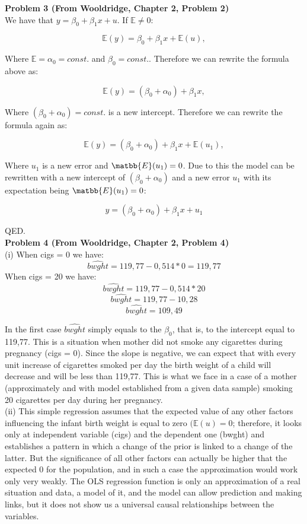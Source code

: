 \documentclass{article}
\begin{document}
\textbf{Problem 3 (From Wooldridge, Chapter 2, Problem 2)}
\\

We have that $y = \beta_0 + \beta_1x + u$. If $\mathbb{E} \neq 0$: 

$$\mathbb{E}(y) = \beta_0 + \beta_1x + \mathbb{E}(u),$$

Where $\mathbb{E} = \alpha_0 = const.$ and $\beta_0 = const.$. Therefore we can rewrite the formula above as:

$$\mathbb{E}(y) = (\beta_0 + \alpha_0) + \beta_1x,$$

Where $(\beta_0 + \alpha_0) = const.$ is a new intercept. Therefore we can rewrite the formula again as:

$$\mathbb{E}(y) = (\beta_0 + \alpha_0) + \beta_1x + \mathbb{E}(u_1),$$

Where $u_1$ is a new error and $\matbb{E}(u_1)=0$. Due to this the model can be rewritten with a new intercept of $(\beta_0 + \alpha_0)$ and a new error $u_1$ with its expectation being $\matbb{E}(u_1) = 0$:

$$y = (\beta_0 + \alpha_0) + \beta_1x + u_1$$

QED.
\\

\textbf{Problem 4 (From Wooldridge, Chapter 2, Problem 4)}
\\

(i) When cigs = 0 we have:
$$\widehat{bwght} = 119,77 - 0,514*0 = 119,77$$
When cigs = 20 we have:
$$\widehat{bwght} = 119,77 - 0,514*20$$
$$\widehat{bwght} = 119,77 - 10,28$$
$$\widehat{bwght} = 109,49$$

In the first case $\widehat{bwght}$ simply equals to the $\beta_0$, that is, to the intercept equal to 119,77. This is a situation when mother did not smoke any cigarettes during pregnancy (cigs = 0). Since the slope is negative, we can expect that with every unit increase of cigarettes smoked per day the birth weight of a child will decrease and will be less than 119,77. This is what we face in a case of a mother (approximately and with model established from a given data sample) smoking 20 cigarettes per day during her pregnancy. 
\\

(ii) This simple regression assumes that the expected value of any other factors influencing the infant birth weight is equal to zero $(\mathbb{E}(u)=0$; therefore, it looks only at independent variable (cigs) and the dependent one (bwght) and establishes a pattern in which a change of the prior is linked to a change of the latter. But the significance of all other factors can actually be higher that the expected 0 for the population, and in such a case the approximation would work only very weakly. The OLS regression function is only an approximation of a real situation and data, a model of it, and the model can allow prediction and making links, but it does not show us a universal causal relationships between the variables. 
\\
\end{document}
